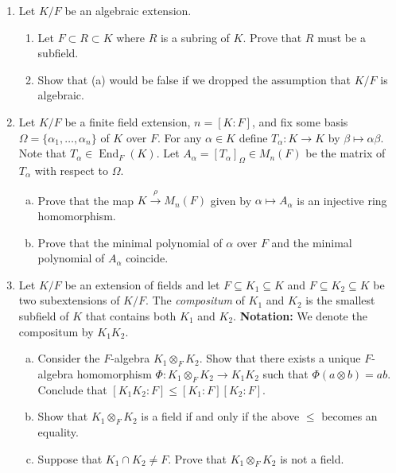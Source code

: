 \documentclass[12pt,
psamsfonts]{amsart}
\theoremstyle{remark}
\theoremstyle{definition}
\newcommand{\Q}{\mathbb{Q}\xspace}
\DeclareMathOperator{\End}{End}
\numberwithin{equation}{section}
\begin{document}
\begin{enumerate}
\item  Let $K/F$ be an algebraic extension.
\begin{enumerate}
\item Let $F\subset R\subset K$ where $R$ is a subring of $K$. Prove that $R$ must be a subfield.
\item Show that (a) would be false if we dropped the assumption that $K/F$ is algebraic.
\end{enumerate}
\medskip
\item Let $K/F$ be a finite field extension, $n=[K:F]$, and fix some basis $\Omega=\{\alpha_1,\ldots,\alpha_n\}$ of $K$ over $F$. For any $\alpha\in K$ define $T_\alpha:K\rightarrow K$ by $\beta\mapsto\alpha\beta$. Note that $T_\alpha\in\End_F(K)$.  Let $A_\alpha=[T_\alpha]_\Omega\in M_n(F)$ be the matrix of $T_\alpha$ with respect to $\Omega$.
\begin{enumerate}
[(a)]\item Prove that the map $K\xrightarrow{\rho} M_n(F)$ given by $\alpha\mapsto A_\alpha$ is an injective ring homomorphism.
\item Prove that the minimal polynomial of $\alpha$ over $F$ and the minimal polynomial of $A_\alpha$ coincide.
\end{enumerate}
\medskip
\item Let $K/F$ be an extension of fields and let $F\subseteq K_1\subseteq K$ and $F\subseteq K_2\subseteq K$ be two subextensions of $K/F$. The \textit{compositum} of $K_1$ and $K_2$ is the smallest subfield of $K$ that contains both $K_1$ and $K_2$. \textbf{Notation:} We denote the compositum by $K_1 K_2$.
\begin{enumerate}
[(a)]\item Consider the $F$-algebra $K_1\otimes_F K_2$. Show that there exists a unique $F$-algebra homomorphism $\Phi:K_1\otimes_F K_2\rightarrow K_1 K_2$ such that $\Phi(a\otimes b)=ab$. Conclude that $[K_1 K_2:F]\leq [K_1:F][K_2:F]$. 
\item Show that $K_1\otimes_F K_2$ is a field if and only if the above $\leq$ becomes an equality.
\item Suppose that $K_1\cap K_2\neq F$. Prove that $K_1\otimes_F K_2$ is not a field.
\end{enumerate}



\end{enumerate}
\end{document}
